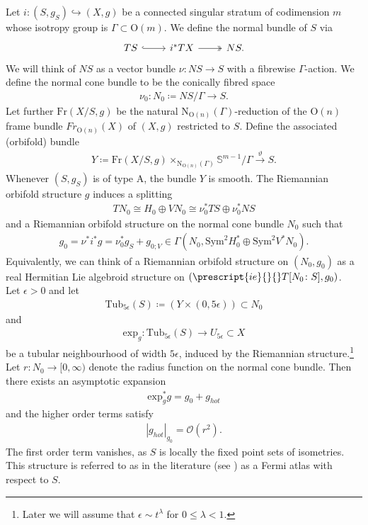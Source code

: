 \documentclass[psamsfonts]{amsart}
\theoremstyle{plain}
\theoremstyle{definition}{
\newtheorem{defi}{Definition}[section]
\newtheorem{ass}{Assumption}
\newtheorem*{nota}{Notation}}
\theoremstyle{remark}{
\newtheorem{rem}{Remark}
\newtheorem{ex}{Example}}
\theoremstyle{plain}{
\newtheorem{thm}{Theorem}[section]
\newtheorem{lem}{Lemma}[section]
\newtheorem{cor}{Corollary}[section]
\newtheorem{prop}{Proposition}[section]
\newtheorem{con}{Conjecture}[section]}
\newcommand{\m}[1]{{\mathrm{#1}}}
\begin{document}
Let $i\colon (S,g_S)\hookrightarrow (X,g)$ be a connected singular stratum of codimension $m$ whose isotropy group is $\Gamma\subset\m{O}(m)$. We define the normal bundle of $S$ via
\begin{equation*}
    \begin{tikzcd}
        TS\arrow[r,hook]&i^*TX\arrow[r, two heads]&NS.
    \end{tikzcd}
\end{equation*}
We will think of $NS$ as a vector bundle $\nu\colon NS\rightarrow S$ with a fibrewise $\Gamma$-action. We define the normal cone bundle to be the conically fibred space 
\begin{align*}
    \nu_0\colon N_0\coloneqq NS/\Gamma\rightarrow S.
\end{align*}
Let further $\m{Fr}(X/S,g)$ be the natural $\m{N}_{\m{O}(n)}(\Gamma)$-reduction of the  $\m{O}(n)$ frame bundle $Fr_{\m{O}(n)}(X)$ of $(X,g)$ restricted to $S$. Define the associated (orbifold) bundle 
\begin{align*}
    Y\coloneqq \m{Fr}(X/S,g)\times_{\m{N}_{\m{O}(n)}(\Gamma)}\mathbb{S}^{m-1}/\Gamma\xrightarrow[]{\vartheta} S.
\end{align*}
Whenever $(S,g_S)$ is of type A, the bundle $Y$ is smooth. The Riemannian orbifold structure $g$ induces a splitting 
\begin{align*}
    TN_0\cong H_0\oplus VN_0\cong\nu^*_0TS\oplus\nu^*_0NS
\end{align*}
and a Riemannian orbifold structure on the normal cone bundle $N_0$ such that
\begin{align*}
    g_0=\nu^*i^*g=\nu^*_0g_S+g_{0;V}\in  \Gamma\left(N_0,\m{Sym}^{2}H_0^*\oplus\m{Sym}^2V^*N_0\right).
\end{align*}
Equivalently, we can think of a Riemannian orbifold structure on $(N_0,g_0)$ as a real Hermitian Lie algebroid structure on $(\prescript{ie}{}{}T[N_0\colon S],g_0)$.\\

Let $\epsilon>0$ and let  
\begin{align*}
    \m{Tub}_{5\epsilon}(S)\coloneqq (Y\times (0,5\epsilon))\subset N_0
\end{align*}
and
\begin{align*}
    \m{exp}_{g}\colon \m{Tub}_{5\epsilon}(S)\rightarrow U_{5\epsilon}\subset X
\end{align*}
be a tubular neighbourhood of width $5\epsilon$, induced by the Riemannian structure.\footnote{Later we will assume that $\epsilon\sim t^\lambda$ for $0\leq\lambda<1$.} Let $r\colon N_0\rightarrow[0,\infty)$ denote the radius function on the normal cone bundle. Then there exists an asymptotic expansion
\begin{align*}
    \m{exp}_{g}^*g=g_0+g_{hot}
\end{align*}
and the higher order terms satisfy
\begin{align*}
    |g_{hot}|_{g_0}=\mathcal{O}(r^2).
\end{align*}
The first order term vanishes, as $S$ is locally the fixed point sets of isometries. This structure is referred to as in the literature (see \cite[Chap. 2]{gray2003tubes}) as a Fermi atlas with respect to $S$.
\end{document}
